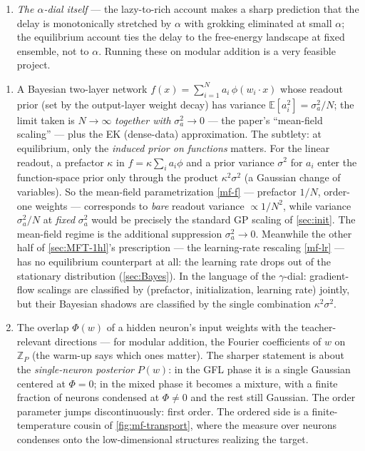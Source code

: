 \documentclass[11pt]{article}
\newcommand{\E}{\mathbb{E}}
\begin{document}
\begin{solution}
\begin{enumerate}
\begin{enumerate}
  \item \emph{The $\alpha$-dial itself} --- the lazy-to-rich account makes a sharp prediction that the delay is monotonically stretched by $\alpha$ with grokking eliminated at small $\alpha$; the equilibrium account ties the delay to the free-energy landscape at fixed ensemble, not to $\alpha$. Running these on modular addition is a very feasible project.
\end{enumerate}
\end{enumerate}
\end{solution}

\begin{solution}[ex:grok]
\begin{enumerate}
    \item A Bayesian two-layer network $f(x)=\sum_{i=1}^N a_i\,\phi(w_i\cdot x)$ whose readout prior (set by the output-layer weight decay) has variance $\E[a_i^2]=\sigma_a^2/N$; the limit taken is $N\to\infty$ \emph{together with} $\sigma_a^2\to 0$ --- the paper's ``mean-field scaling'' --- plus the EK (dense-data) approximation. The subtlety: at equilibrium, only the \emph{induced prior on functions} matters. For the linear readout, a prefactor $\kappa$ in $f=\kappa\sum_i a_i\phi$ and a prior variance $\sigma^2$ for $a_i$ enter the function-space prior only through the product $\kappa^2\sigma^2$ (a Gaussian change of variables). So the mean-field parametrization \eqref{mf-f} --- prefactor $1/N$, order-one weights --- corresponds to \emph{bare} readout variance $\propto 1/N^2$, while variance $\sigma_a^2/N$ at \emph{fixed} $\sigma_a^2$ would be precisely the standard GP scaling of \cref{sec:init}. The mean-field regime is the additional suppression $\sigma_a^2\to0$. Meanwhile the other half of \cref{sec:MFT-1hl}'s prescription --- the learning-rate rescaling \eqref{mf-lr} --- has no equilibrium counterpart at all: the learning rate drops out of the stationary distribution (\cref{sec:Bayes}). In the language of the $\gamma$-dial: gradient-flow scalings are classified by (prefactor, initialization, learning rate) jointly, but their Bayesian shadows are classified by the single combination $\kappa^2\sigma^2$.
    \item The overlap $\Phi(w)$ of a hidden neuron's input weights with the teacher-relevant directions --- for modular addition, the Fourier coefficients of $w$ on $\mathbb{Z}_P$ (the warm-up \cite{gromov2023grokking} says which ones matter). The sharper statement is about the \emph{single-neuron posterior} $P(w)$: in the GFL phase it is a single Gaussian centered at $\Phi=0$; in the mixed phase it becomes a mixture, with a finite fraction of neurons condensed at $\Phi\neq 0$ and the rest still Gaussian. The order parameter jumps discontinuously: first order. The ordered side is a finite-temperature cousin of \cref{fig:mf-transport}, where the measure over neurons condenses onto the low-dimensional structures realizing the target.

\end{enumerate}
\end{solution}
\end{document}
